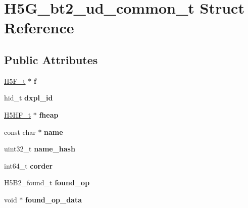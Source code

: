 \hypertarget{struct_h5_g__bt2__ud__common__t}{}\section{H5\+G\+\_\+bt2\+\_\+ud\+\_\+common\+\_\+t Struct Reference}
\label{struct_h5_g__bt2__ud__common__t}
\subsection*{Public Attributes}
\begin{DoxyCompactItemize}
\item 
\mbox{\label{struct_h5_g__bt2__ud__common__t_a12c2645c2c227219913107e27e2cf7c8}} 
\hyperlink{struct_h5_f__t}{H5\+F\+\_\+t} $\ast$ {\bfseries f}
\item 
\mbox{\label{struct_h5_g__bt2__ud__common__t_aea0092aa2a74a6e0f610acefe0dfcfaa}} 
hid\+\_\+t {\bfseries dxpl\+\_\+id}
\item 
\mbox{\label{struct_h5_g__bt2__ud__common__t_a1a3899fdef0738443682ac7b6efc736f}} 
\hyperlink{struct_h5_h_f__t}{H5\+H\+F\+\_\+t} $\ast$ {\bfseries fheap}
\item 
\mbox{\label{struct_h5_g__bt2__ud__common__t_abb48c1e5b34c51e5d56684cb4794975e}} 
const char $\ast$ {\bfseries name}
\item 
\mbox{\label{struct_h5_g__bt2__ud__common__t_a01b8fb44aaad31c7551b80a367ff2461}} 
uint32\+\_\+t {\bfseries name\+\_\+hash}
\item 
\mbox{\label{struct_h5_g__bt2__ud__common__t_a9f863a6384b702f7cf4599e7415ce20b}} 
int64\+\_\+t {\bfseries corder}
\item 
\mbox{\label{struct_h5_g__bt2__ud__common__t_afdafc0a3a31ea6187e07b3a874af68ae}} 
H5\+B2\+\_\+found\+\_\+t {\bfseries found\+\_\+op}
\item 
\mbox{\label{struct_h5_g__bt2__ud__common__t_a838963380c5ae6a999151f35799f5cb1}} 
void $\ast$ {\bfseries found\+\_\+op\+\_\+data}
\end{DoxyCompactItemize}


